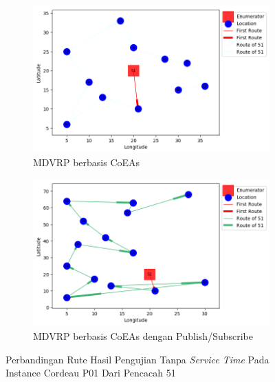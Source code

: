 \begin{figure}[H]
	\centering
	\begin{subfigure}[t]{\textwidth}
		\centering
		\includegraphics[width=\textwidth]{Resources/Images/cordeau_p01/cordeau_p01_notw_51_coes}
		\caption{MDVRP berbasis CoEAs}
		\label{fig:cordeau_p01_notw_51_coes}
	\end{subfigure}
	\begin{subfigure}[t]{\textwidth}
		\centering
		\includegraphics[width=\textwidth]{Resources/Images/cordeau_p01/cordeau_p01_notw_51_pubsub_coes}
		\caption{MDVRP berbasis CoEAs dengan Publish/Subscribe}
		\label{fig:cordeau_p01_notw_51_pubsub_coes}
	\end{subfigure}
	\caption{Perbandingan Rute Hasil Pengujian Tanpa \textit{Service Time} Pada Instance Cordeau P01 Dari Pencacah 51}
	\label{fig:cordeau_p01_notw_51}
\end{figure}



